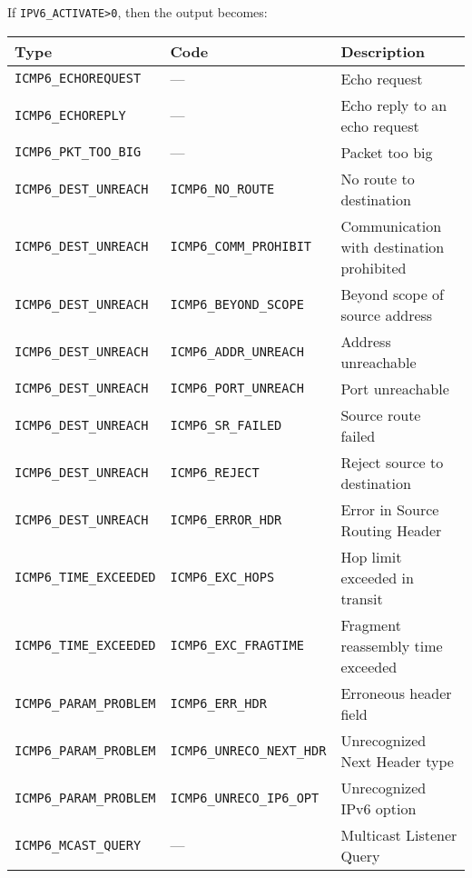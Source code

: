 \documentclass[documentation]{subfiles}
\begin{document}
If {\tt IPV6\_ACTIVATE>0}, then the output becomes:
\begin{longtable}{lll}
    \toprule
    {\bf Type}                     & {\bf Code}                     & {\bf Description}\\
    \midrule\endhead%
    {\tt ICMP6\_ECHOREQUEST}       & ---                            & Echo request \\
    {\tt ICMP6\_ECHOREPLY}         & ---                            & Echo reply to an echo request \\
    {\tt ICMP6\_PKT\_TOO\_BIG}     & ---                            & Packet too big\\
    {\tt ICMP6\_DEST\_UNREACH}     & {\tt ICMP6\_NO\_ROUTE}         & No route to destination\\
    {\tt ICMP6\_DEST\_UNREACH}     & {\tt ICMP6\_COMM\_PROHIBIT}    & Communication with destination prohibited\\
    {\tt ICMP6\_DEST\_UNREACH}     & {\tt ICMP6\_BEYOND\_SCOPE}     & Beyond scope of source address\\
    {\tt ICMP6\_DEST\_UNREACH}     & {\tt ICMP6\_ADDR\_UNREACH}     & Address unreachable\\
    {\tt ICMP6\_DEST\_UNREACH}     & {\tt ICMP6\_PORT\_UNREACH}     & Port unreachable\\
    {\tt ICMP6\_DEST\_UNREACH}     & {\tt ICMP6\_SR\_FAILED}        & Source route failed \\
    {\tt ICMP6\_DEST\_UNREACH}     & {\tt ICMP6\_REJECT}            & Reject source to destination\\
    {\tt ICMP6\_DEST\_UNREACH}     & {\tt ICMP6\_ERROR\_HDR}        & Error in Source Routing Header\\
    {\tt ICMP6\_TIME\_EXCEEDED}    & {\tt ICMP6\_EXC\_HOPS}         & Hop limit exceeded in transit\\
    {\tt ICMP6\_TIME\_EXCEEDED}    & {\tt ICMP6\_EXC\_FRAGTIME}     & Fragment reassembly time exceeded\\
    {\tt ICMP6\_PARAM\_PROBLEM}    & {\tt ICMP6\_ERR\_HDR}          & Erroneous header field\\
    {\tt ICMP6\_PARAM\_PROBLEM}    & {\tt ICMP6\_UNRECO\_NEXT\_HDR} & Unrecognized Next Header type\\
    {\tt ICMP6\_PARAM\_PROBLEM}    & {\tt ICMP6\_UNRECO\_IP6\_OPT}  & Unrecognized IPv6 option\\
    {\tt ICMP6\_MCAST\_QUERY}      & ---                            & Multicast Listener Query\\

\end{longtable}
\end{document}
